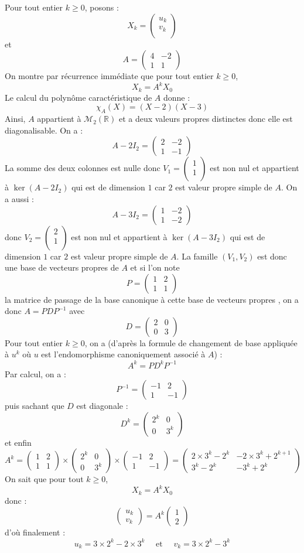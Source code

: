 \documentclass[a4paper,10pt]{report}
\newcommand{\pmatrice}[1]{\begin{pmatrix}#1\end{pmatrix}}
\begin{document}
\corr Pour tout entier $k \geq 0$, posons :
$$ X_k = \begin{pmatrix}
u_k \\
v_k \\
\end{pmatrix}$$
et
$$ A=\pmatrice{4&-2\\1&1} $$
On montre par récurrence immédiate que pour tout entier $k \geq 0$,
$$ X_k=A^k X_0$$
Le calcul du polynôme caractéristique de $A$ donne :
$$ \chi_A(X) = (X-2)(X-3)$$
Ainsi, $A$ appartient à $\mathcal{M}_2(\mathbb{R})$ et a deux valeurs propres distinctes donc elle est diagonalisable. On a :
$$ A - 2I_2 = \pmatrice{2&-2\\1&-1}$$
La somme des deux colonnes est nulle donc $V_1=\begin{pmatrix}
1 \\
1 \\
\end{pmatrix}$
est non nul et appartient à $\ker(A-2I_2)$ qui est de dimension $1$ car $2$ est valeur propre simple de $A$. On a aussi :
$$A-3I_2=\pmatrice{1&-2\\1&-2}$$ 
donc $V_2=\begin{pmatrix}
2 \\
1 \\
\end{pmatrix}$ est non nul et appartient à $\ker(A-3I_2)$ qui est de dimension $1$ car $2$ est valeur propre simple de $A$. La famille $(V_1,V_2)$ est donc une base de vecteurs propres de $A$ et si l'on note 
$$P=\pmatrice{1&2 \\ 1&1}$$
la matrice de passage de la base canonique \`a cette base de vecteurs propres , on a donc $A=PDP^{-1}$ avec 
$$D=\pmatrice{2&0\\0&3}$$
Pour tout entier $k \geq 0$, on a (d'après la formule de changement de base appliquée à $u^k$ où $u$ est l'endomorphisme canoniquement associé à $A$) :
$$A^k=PD^kP^{-1}$$
Par calcul, on a : 
$$P^{-1}=\pmatrice{-1&2\\1&-1}$$
puis sachant que $D$ est diagonale : 
$$D^k=\pmatrice{2^k&0\\0&3^k}$$ 
et enfin 
$$A^k=\pmatrice{1&2 \\ 1&1}\times\pmatrice{2^k&0\\0&3^k}\times \pmatrice{-1&2\\1&-1} = \pmatrice{2 \times 3^k-2^k & -2 \times 3^k+2^{k+1}\\[0.15cm]3^k-2^k& -3^k+2^k}$$
On sait que pour tout $k \geq 0$,
$$X_k=A^kX_0$$
donc :
$$\pmatrice{u_k\\v_k}=A^k\pmatrice{1\\2}$$
d'o\`u finalement :
\[
u_k=3 \times 2^k-2 \times 3^k \quad \textrm{ et } \quad v_k=3 \times 2^k-3^k 
\]
\medskip
\end{document}
